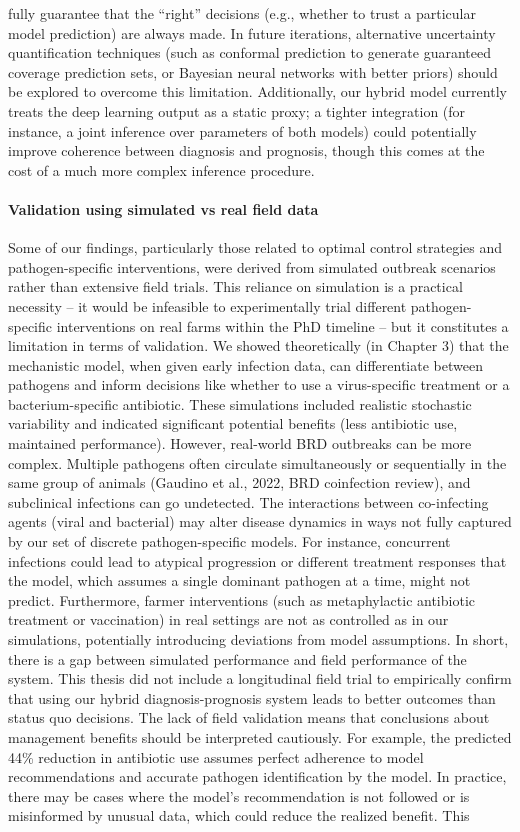 fully guarantee that the “right” decisions (e.g., whether to trust a particular model prediction) are always made. In future iterations, alternative uncertainty quantification techniques (such as conformal prediction to generate guaranteed coverage prediction sets, or Bayesian neural networks with better priors) should be explored to overcome this limitation. Additionally, our hybrid model currently treats the deep learning output as a static proxy; a tighter integration (for instance, a joint inference over parameters of both models) could potentially improve coherence between diagnosis and prognosis, though this comes at the cost of a much more complex inference procedure.

\paragraph{Validation using simulated vs real field data} Some of our findings, particularly those related to optimal control strategies and pathogen-specific interventions, were derived from simulated outbreak scenarios rather than extensive field trials. This reliance on simulation is a practical necessity – it would be infeasible to experimentally trial different pathogen-specific interventions on real farms within the PhD timeline – but it constitutes a limitation in terms of validation. We showed theoretically (in Chapter 3) that the mechanistic model, when given early infection data, can differentiate between pathogens and inform decisions like whether to use a virus-specific treatment or a bacterium-specific antibiotic. These simulations included realistic stochastic variability and indicated significant potential benefits (less antibiotic use, maintained performance). However, real-world BRD outbreaks can be more complex. Multiple pathogens often circulate simultaneously or sequentially in the same group of animals (Gaudino et al., 2022, BRD coinfection review), and subclinical infections can go undetected. The interactions between co-infecting agents (viral and bacterial) may alter disease dynamics in ways not fully captured by our set of discrete pathogen-specific models. For instance, concurrent infections could lead to atypical progression or different treatment responses that the model, which assumes a single dominant pathogen at a time, might not predict. Furthermore, farmer interventions (such as metaphylactic antibiotic treatment or vaccination) in real settings are not as controlled as in our simulations, potentially introducing deviations from model assumptions. In short, there is a gap between simulated performance and field performance of the system. This thesis did not include a longitudinal field trial to empirically confirm that using our hybrid diagnosis-prognosis system leads to better outcomes than status quo decisions. The lack of field validation means that conclusions about management benefits should be interpreted cautiously. For example, the predicted 44\% reduction in antibiotic use assumes perfect adherence to model recommendations and accurate pathogen identification by the model. In practice, there may be cases where the model’s recommendation is not followed or is misinformed by unusual data, which could reduce the realized benefit. This 
